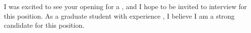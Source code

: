 \begin{cvletter}
  I was excited to see your opening for a \clposition{}, and I hope
	to be invited to interview for this position. As a graduate student
  with experience \clintroexp, I believe I am a strong candidate for
  this position.
\end{cvletter}
